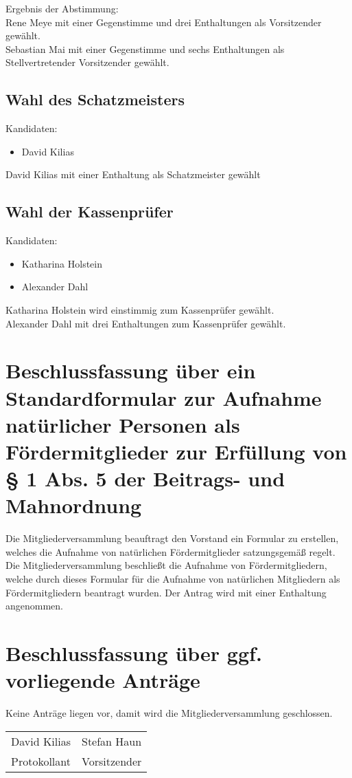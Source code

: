 \documentclass[a4paper,12pt,titlepage]{scrartcl}
\begin{document}
Ergebnis der Abstimmung: \\
Rene Meye mit einer Gegenstimme und drei Enthaltungen als Vorsitzender gewählt. \\
Sebastian Mai mit einer Gegenstimme und sechs Enthaltungen als Stellvertretender Vorsitzender gewählt.

\subsection{Wahl des Schatzmeisters}
Kandidaten:
\begin{itemize}
	\item David Kilias
\end{itemize}
David Kilias mit einer Enthaltung als Schatzmeister gewählt

\subsection{Wahl der Kassenprüfer}
Kandidaten:
\begin{itemize}
  \item Katharina Holstein
  \item Alexander Dahl
\end{itemize}
Katharina Holstein wird einstimmig zum Kassenprüfer gewählt. \\
Alexander Dahl mit drei Enthaltungen zum Kassenprüfer gewählt.

\section{Beschlussfassung über ein Standardformular zur Aufnahme natürlicher Personen als Fördermitglieder zur Erfüllung von § 1
Abs. 5 der Beitrags- und Mahnordnung}
Die Mitgliederversammlung beauftragt den Vorstand ein Formular zu erstellen,	welches die Aufnahme von natürlichen Fördermitglieder satzungsgemäß regelt.
Die Mitgliederversammlung beschließt die Aufnahme von Fördermitgliedern,	welche durch dieses Formular für die Aufnahme von natürlichen Mitgliedern als Fördermitgliedern beantragt wurden.
Der Antrag wird mit einer Enthaltung angenommen.

\section{Beschlussfassung über ggf. vorliegende Anträge}
Keine Anträge liegen vor, damit wird die Mitgliederversammlung geschlossen.

\nopagebreak
\vspace{10\baselineskip}
\begin{tabularx}{\textwidth}[b]{X X}
	\hline
	David Kilias & Stefan Haun \\
	Protokollant & Vorsitzender
\end{tabularx}
\end{document}

